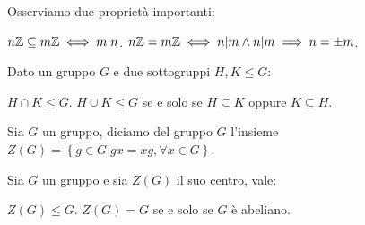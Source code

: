 \documentclass[11pt]{scrartcl}
\begin{document}
\begin{remark}
Osserviamo due proprietà importanti:
	\begin{itemize}
		\ii $n\mathbb Z \subseteq m\mathbb Z \iff m|n$.
		\ii $n\mathbb Z=m\mathbb Z \iff n|m \land n|m \implies n=\pm m$.
	\end{itemize}
\end{remark}


\begin{corollary}
Dato un gruppo $G$ e due sottogruppi $H, K \leqslant G$:
	\begin{itemize}
		\ii $H \cap K \leqslant G$.
		\ii $H \cup K \leqslant G$ se e solo se $H \subseteq K$ oppure $K \subseteq H$.
	\end{itemize}
\end{corollary}

\newpage

\begin{definition}
	Sia $G$ un gruppo, diciamo  del gruppo $G$ l'insieme $Z(G)=\left\{g \in G | gx=xg, \forall x \in G\right\}$.
\end{definition}

\begin{theorem}
\label{g:centro}
Sia $G$ un gruppo e sia $Z(G)$ il suo centro, vale:
	\begin{enumerate}[(1)]
		\ii $Z(G) \leqslant G$.
		\ii $Z(G)=G$ se e solo se $G$ è abeliano.
	\end{enumerate}
\end{theorem}
\end{document}
